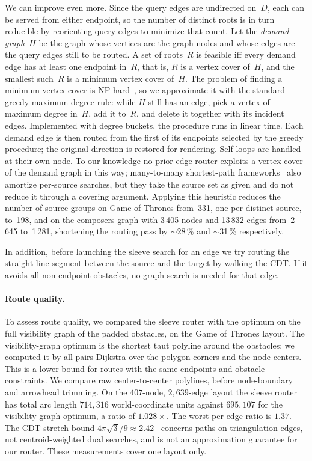 \documentclass[review]{vgtc}          %
\begin{document}
We can improve even more. Since the query edges are undirected
on~$D$, each can be served from either endpoint, so the number of
distinct roots is in turn reducible by reorienting query edges to
minimize that count. Let the \emph{demand graph}~$H$ be the graph
whose vertices are the graph nodes and whose edges are the query
edges still to be routed. A set of roots~$R$ is feasible iff every
demand edge has at least one endpoint in~$R$, that is, $R$ is a
vertex cover of~$H$, and the smallest such~$R$ is a minimum vertex
cover of~$H$. The problem of finding a minimum vertex cover is
NP-hard~\cite{karp1972reducibility}, so we approximate it
with the standard greedy maximum-degree rule: while $H$ still has an
edge, pick a vertex of maximum degree in~$H$, add it to~$R$, and
delete it together with its incident edges. Implemented with degree
buckets, the procedure runs in linear time. Each demand edge is then
routed from the first of its endpoints selected by the greedy
procedure; the original direction is restored for rendering.
Self-loops are handled at their own node. To our knowledge no
prior edge router exploits a vertex cover of the demand graph in
this way; many-to-many shortest-path
frameworks~\cite{knopp2007many} also amortize per-source searches,
but they take the source set as given and do not reduce it through a
covering argument. Applying this heuristic reduces the number of
source groups on Game of Thrones from~331, one per distinct source,
to~198, and on the composers graph with 3\,405 nodes and 13\,832
edges from~2\,645 to~1\,281, shortening the routing pass by
$\sim$28\,\% and $\sim$31\,\% respectively.

In addition, before launching the sleeve search for an edge we try routing the
straight line segment between the source and the target by walking the
CDT. If it avoids all non-endpoint obstacles, no graph search is
needed for that edge.

\paragraph{Route quality.}
To assess route quality, we compared the sleeve router with the
optimum on the full visibility graph of the padded obstacles, on the
Game of Thrones layout. The visibility-graph optimum is the shortest
taut polyline around the obstacles; we computed it by all-pairs
Dijkstra over the polygon corners and the node centers. This is a
lower bound for routes with the same endpoints and obstacle
constraints. We compare raw center-to-center polylines, before
node-boundary and arrowhead trimming. On the $407$-node,
$2{,}639$-edge layout the sleeve router has total arc length
$714{,}316$ world-coordinate units against $695{,}107$ for the
visibility-graph optimum, a ratio of $1.028\times$. The worst
per-edge ratio is $1.37$. The CDT stretch bound
$4\pi\sqrt{3}/9 \approx 2.42$~\cite{bose2006stretch} concerns
paths on triangulation edges, not centroid-weighted dual searches,
and is not an approximation guarantee for our router. These
measurements cover one layout only.
\end{document}
